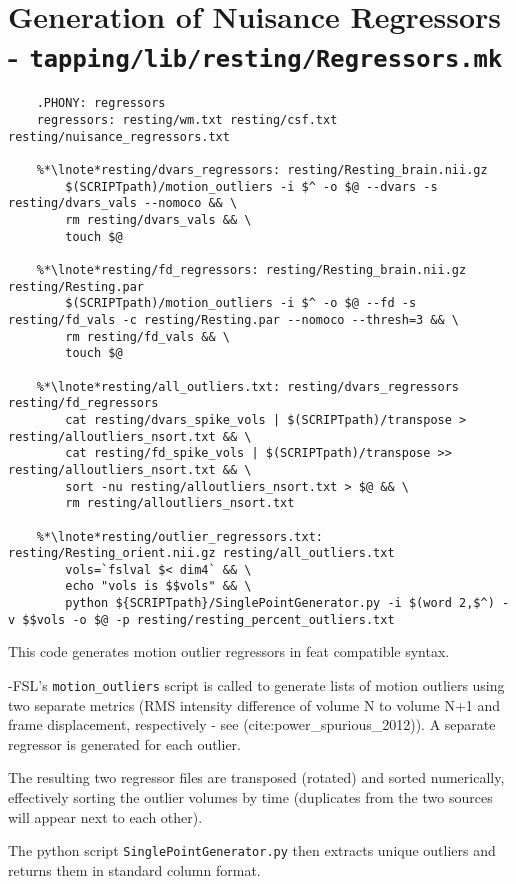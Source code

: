 \section{Generation of Nuisance Regressors - \texttt{tapping/lib/resting/Regressors.mk}}
\begin{lstlisting}
	.PHONY: regressors
	regressors: resting/wm.txt resting/csf.txt resting/nuisance_regressors.txt
	
	%*\lnote*resting/dvars_regressors: resting/Resting_brain.nii.gz
		$(SCRIPTpath)/motion_outliers -i $^ -o $@ --dvars -s resting/dvars_vals --nomoco && \
		rm resting/dvars_vals && \
		touch $@
	
	%*\lnote*resting/fd_regressors: resting/Resting_brain.nii.gz resting/Resting.par
		$(SCRIPTpath)/motion_outliers -i $^ -o $@ --fd -s resting/fd_vals -c resting/Resting.par --nomoco --thresh=3 && \
		rm resting/fd_vals && \
		touch $@
	
	%*\lnote*resting/all_outliers.txt: resting/dvars_regressors resting/fd_regressors
		cat resting/dvars_spike_vols | $(SCRIPTpath)/transpose > resting/alloutliers_nsort.txt && \
		cat resting/fd_spike_vols | $(SCRIPTpath)/transpose >> resting/alloutliers_nsort.txt && \
		sort -nu resting/alloutliers_nsort.txt > $@ && \
		rm resting/alloutliers_nsort.txt
	
	%*\lnote*resting/outlier_regressors.txt: resting/Resting_orient.nii.gz resting/all_outliers.txt
		vols=`fslval $< dim4` && \
		echo "vols is $$vols" && \
		python ${SCRIPTpath}/SinglePointGenerator.py -i $(word 2,$^) -v $$vols -o $@ -p resting/resting_percent_outliers.txt
\end{lstlisting}

This code generates motion outlier regressors in feat compatible syntax.

-FSL's \texttt{motion_outliers} script is called to generate lists of motion outliers using two separate metrics (RMS intensity difference of volume N to volume N+1 and frame displacement, respectively - see (cite:power_spurious_2012)). A separate regressor is generated for each outlier.

\lnum{29}The resulting two regressor files are transposed (rotated) and sorted numerically, effectively sorting the outlier volumes by time (duplicates from the two sources will appear next to each other).

\lnum{30}The python script \texttt{SinglePointGenerator.py} then extracts unique outliers and returns them in standard column format.

